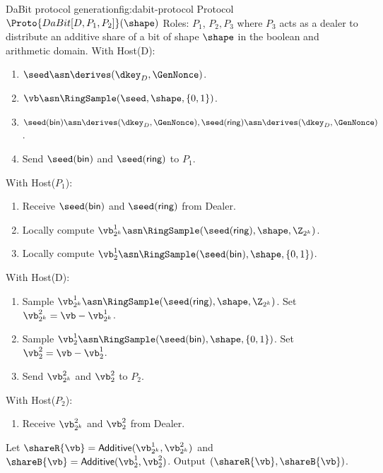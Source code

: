 \begin{Boxfig}{DaBit protocol generation}{fig:dabit-protocol}
  {Protocol $\Proto{DaBit[D, P_1, P_2]}(\shape)$}
  Roles: $P_1$, $P_2, P_3$ where $P_3$ acts as a dealer to distribute
  an additive share of a bit of shape $\shape$ in the boolean and arithmetic domain. \newline
  With Host(D):
  \begin{enumerate}
    \item $\seed \asn \derives(\dkey_D, \GenNonce)$.
    \item $\vb \asn \RingSample(\seed, \shape, \{0, 1\})$.
    \item $\seed(\textsf{bin}) \asn \derives(\dkey_D, \GenNonce), \seed(\textsf{ring}) \asn \derives(\dkey_D, \GenNonce)$.
    \item Send $\seed(\textsf{bin})$ and $\seed(\textsf{ring})$ to $P_1$.

  \end{enumerate}
 With Host($P_1$):
 \begin{enumerate}
     \item Receive $\seed(\textsf{bin})$ and $\seed(\textsf{ring})$ from Dealer.
     \item Locally compute $\vb^1_{2^k} \asn \RingSample(\seed(\textsf{ring}), \shape, \Z_{2^k})$.
     \item Locally compute $\vb^1_{2} \asn \RingSample(\seed(\textsf{bin}), \shape, \{0, 1\})$.
 \end{enumerate}
With Host(D):
\begin{enumerate}
    \item Sample $\vb^1_{2^k} \asn \RingSample(\seed(\textsf{ring}), \shape, \Z_{2^k})$. Set $\vb^2_{2^k} = \vb - \vb^1_{2^k}$.
    \item Sample $\vb^1_{2} \asn \RingSample(\seed(\textsf{bin}), \shape, \{0, 1\})$. Set $\vb^2_{2} = \vb - \vb^1_{2}$. 
    \item Send $\vb^2_{2^k}$ and $\vb^2_2$ to $P_2$.
\end{enumerate}
With Host($P_2$):
\begin{enumerate}
    \item Receive $\vb^2_{2^k}$ and $\vb^2_2$ from Dealer.
\end{enumerate}
Let $\shareR{\vb} = \textsf{Additive}(\vb^1_{2^k}, \vb^2_{2^k})$ and $\shareB{\vb} = \textsf{Additive}(\vb^1_2, \vb^2_2)$. Output $(\shareR{\vb}, \shareB{\vb})$.
\end{Boxfig}

